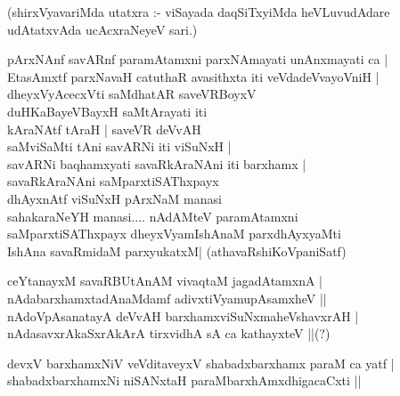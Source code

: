 (shirxVyavariMda utatxra :- viSayada daqSiTxyiMda heVLuvudAdare udAtatxvAda ucAcxraNeyeV sari.)
\begin{itemize}
{\bf 
\item[33.] pArxNAnf savARnf paramAtamxni parxNAmayati unAnxmayati ca |\\\label{149}
EtasAmxtf parxNavaH catuthaR avasithxta iti veVdadeVvayoVniH |\\
dheyxVyAcecxVti saMdhatAR saveVRBoyxV \\
duHKaBayeVBayxH saMtArayati iti \\
kAraNAtf tAraH | saveVR deVvAH \\
saMviSaMti tAni savARNi iti viSuNxH |\\
savARNi baqhamxyati savaRkAraNAni iti barxhamx |\\
savaRkAraNAni saMparxtiSAThxpayx \\
dhAyxnAtf viSuNxH pArxNaM manasi \\
sahakaraNeYH manasi.... nAdAMteV paramAtamxni\\
saMparxtiSAThxpayx dheyxVyamIshAnaM parxdhAyxyaMti\\
IshAna savaRmidaM parxyukatxM|\label{102}
\hfill{(athavaRshiKoVpaniSatf)}
\item[34.] ceYtanayxM savaRBUtAnAM vivaqtaM jagadAtamxnA |\\\label{149}
nAdabarxhamxtadAnaMdamf adivxtiVyamupAsamxheV ||\\
nAdoVpAsanatayA deVvAH barxhamxviSuNxmaheVshavxrAH |\\
nAdasavxrAkaSxrAkArA tirxvidhA sA ca kathayxteV ||\quad(?)\label{149}
\item[35.] devxV barxhamxNiV veVditaveyxV shabadxbarxhamx paraM ca yatf |\\\label{149}
shabadxbarxhamxNi niSANxtaH paraMbarxhAmxdhigacaCxti ||\label{160}

}
\end{itemize}
